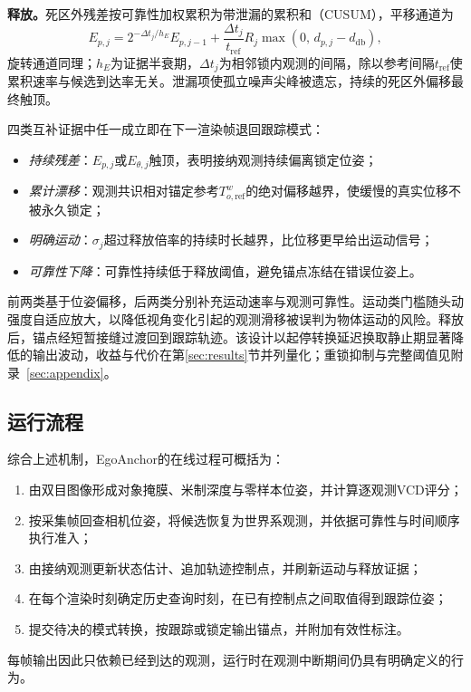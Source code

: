 \documentclass[review]{vgtc}
\begin{document}
\textbf{释放。}死区外残差按可靠性加权累积为带泄漏的累积和（CUSUM），平移通道为
\begin{equation}
E_{p,j} = 2^{-\Delta t_j / h_E} E_{p,j-1} + \frac{\Delta t_j}{t_{\mathrm{ref}}} R_j \max\!\left(0,\, d_{p,j} - d_{\mathrm{db}}\right),
\label{eq:cusum}
\end{equation}
旋转通道同理；$h_E$为证据半衰期，$\Delta t_j$为相邻锁内观测的间隔，除以参考间隔$t_{\mathrm{ref}}$使累积速率与候选到达率无关。泄漏项使孤立噪声尖峰被遗忘，持续的死区外偏移最终触顶。

四类互补证据中任一成立即在下一渲染帧退回跟踪模式：

\begin{itemize}[leftmargin=1.6em,itemsep=1pt,topsep=2pt]
  \item \emph{持续残差}：$E_{p,j}$或$E_{\theta,j}$触顶，表明接纳观测持续偏离锁定位姿；
  \item \emph{累计漂移}：观测共识相对锚定参考$T_{o,\mathrm{ref}}^w$的绝对偏移越界，使缓慢的真实位移不被永久锁定；
  \item \emph{明确运动}：$\sigma_j$超过释放倍率的持续时长越界，比位移更早给出运动信号；
  \item \emph{可靠性下降}：可靠性持续低于释放阈值，避免锚点冻结在错误位姿上。
\end{itemize}

前两类基于位姿偏移，后两类分别补充运动速率与观测可靠性。运动类门槛随头动强度自适应放大，以降低视角变化引起的观测滑移被误判为物体运动的风险。释放后，锚点经短暂接缝过渡回到跟踪轨迹。该设计以起停转换延迟换取静止期显著降低的输出波动，收益与代价在第\ref{sec:results}节并列量化；重锁抑制与完整阈值见附录~\ref{sec:appendix}。

\subsection{运行流程}\label{sec:runtime-alg}

综合上述机制，EgoAnchor的在线过程可概括为：
\begin{enumerate}[leftmargin=1.6em,itemsep=1pt,topsep=2pt]
  \item 由双目图像形成对象掩膜、米制深度与零样本位姿，并计算逐观测VCD评分；
  \item 按采集帧回查相机位姿，将候选恢复为世界系观测，并依据可靠性与时间顺序执行准入；
  \item 由接纳观测更新状态估计、追加轨迹控制点，并刷新运动与释放证据；
  \item 在每个渲染时刻确定历史查询时刻，在已有控制点之间取值得到跟踪位姿；
  \item 提交待决的模式转换，按跟踪或锁定输出锚点，并附加有效性标注。
\end{enumerate}
每帧输出因此只依赖已经到达的观测，运行时在观测中断期间仍具有明确定义的行为。
\end{document}
